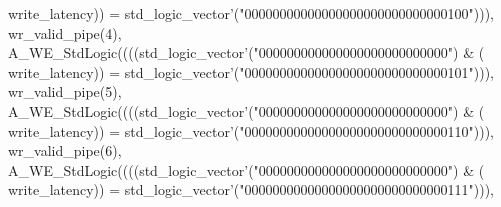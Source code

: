 \begin{DoxyCode}
{      write_latency}\textcolor{vhdlchar}{)}\textcolor{vhdlchar}{)} \textcolor{vhdlchar}{=} \textcolor{comment}{std\_logic\_vector}\textcolor{vhdlchar}{'}\textcolor{vhdlchar}{(}\textcolor{vhdllogic}{"00000000000000000000000000000100"}\textcolor{vhdlchar}{)}\textcolor{vhdlchar}{)}\textcolor{vhdlchar}{)}\textcolor{vhdlchar}{,} \textcolor{vhdlchar}{
      wr_valid_pipe}\textcolor{vhdlchar}{(}\textcolor{vhdllogic}{}\textcolor{vhdllogic}{4}\textcolor{vhdlchar}{)}\textcolor{vhdlchar}{,} \textcolor{vhdlchar}{A\_WE\_StdLogic}\textcolor{vhdlchar}{(}\textcolor{vhdlchar}{(}\textcolor{vhdlchar}{(}\textcolor{vhdlchar}{(}\textcolor{comment}{std\_logic\_vector}\textcolor{vhdlchar}{'}\textcolor{vhdlchar}{(}\textcolor{vhdllogic}{"000000000000000000000000000"}\textcolor{vhdlchar}{)} \textcolor{vhdlchar}{&} \textcolor{vhdlchar}{(}\textcolor{vhdlchar}{
      write_latency}\textcolor{vhdlchar}{)}\textcolor{vhdlchar}{)} \textcolor{vhdlchar}{=} \textcolor{comment}{std\_logic\_vector}\textcolor{vhdlchar}{'}\textcolor{vhdlchar}{(}\textcolor{vhdllogic}{"00000000000000000000000000000101"}\textcolor{vhdlchar}{)}\textcolor{vhdlchar}{)}\textcolor{vhdlchar}{)}\textcolor{vhdlchar}{,} \textcolor{vhdlchar}{
      wr_valid_pipe}\textcolor{vhdlchar}{(}\textcolor{vhdllogic}{}\textcolor{vhdllogic}{5}\textcolor{vhdlchar}{)}\textcolor{vhdlchar}{,} \textcolor{vhdlchar}{A\_WE\_StdLogic}\textcolor{vhdlchar}{(}\textcolor{vhdlchar}{(}\textcolor{vhdlchar}{(}\textcolor{vhdlchar}{(}\textcolor{comment}{std\_logic\_vector}\textcolor{vhdlchar}{'}\textcolor{vhdlchar}{(}\textcolor{vhdllogic}{"000000000000000000000000000"}\textcolor{vhdlchar}{)} \textcolor{vhdlchar}{&} \textcolor{vhdlchar}{(}\textcolor{vhdlchar}{
      write_latency}\textcolor{vhdlchar}{)}\textcolor{vhdlchar}{)} \textcolor{vhdlchar}{=} \textcolor{comment}{std\_logic\_vector}\textcolor{vhdlchar}{'}\textcolor{vhdlchar}{(}\textcolor{vhdllogic}{"00000000000000000000000000000110"}\textcolor{vhdlchar}{)}\textcolor{vhdlchar}{)}\textcolor{vhdlchar}{)}\textcolor{vhdlchar}{,} \textcolor{vhdlchar}{
      wr_valid_pipe}\textcolor{vhdlchar}{(}\textcolor{vhdllogic}{}\textcolor{vhdllogic}{6}\textcolor{vhdlchar}{)}\textcolor{vhdlchar}{,} \textcolor{vhdlchar}{A\_WE\_StdLogic}\textcolor{vhdlchar}{(}\textcolor{vhdlchar}{(}\textcolor{vhdlchar}{(}\textcolor{vhdlchar}{(}\textcolor{comment}{std\_logic\_vector}\textcolor{vhdlchar}{'}\textcolor{vhdlchar}{(}\textcolor{vhdllogic}{"000000000000000000000000000"}\textcolor{vhdlchar}{)} \textcolor{vhdlchar}{&} \textcolor{vhdlchar}{(}\textcolor{vhdlchar}{
      write_latency}\textcolor{vhdlchar}{)}\textcolor{vhdlchar}{)} \textcolor{vhdlchar}{=} \textcolor{comment}{std\_logic\_vector}\textcolor{vhdlchar}{'}\textcolor{vhdlchar}{(}\textcolor{vhdllogic}{"00000000000000000000000000000111"}\textcolor{vhdlchar}{)}\textcolor{vhdlchar}{)}\textcolor{vhdlchar}{)}\textcolor{vhdlchar}{,} \textcolor{vhdlchar}{
}
\end{DoxyCode}
